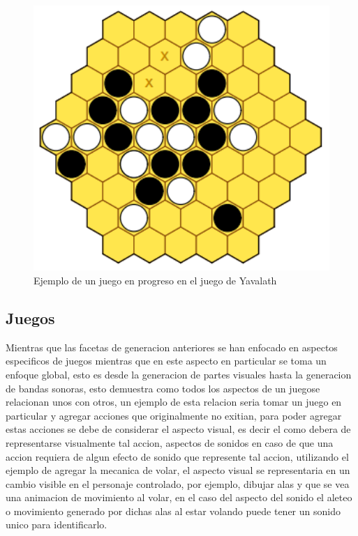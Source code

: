 \begin{figure}
    \centering
    \includegraphics[width=1.0\textwidth]{img/Yavalath.png}
    \caption{Ejemplo de un juego en progreso en el juego de Yavalath}
    \label{figure:Yavalath}
\end{figure}

\subsection{Juegos}
\label{subsection:games}

Mientras que las facetas de generacion anteriores se han enfocado en aspectos
especificos de juegos mientras que en este aspecto en particular se toma un
enfoque global, esto es desde la generacion de partes visuales hasta la 
generacion de bandas sonoras, esto demuestra como todos los aspectos de un
juegose relacionan unos con otros, un ejemplo de esta relacion seria tomar un
juego en particular y agregar acciones que originalmente no exitian, para poder
agregar estas acciones se debe de considerar el aspecto visual, es decir el como
debera de representarse visualmente tal accion, aspectos de sonidos en caso de
que una accion requiera de algun efecto de sonido que represente tal accion,
utilizando el ejemplo de agregar la mecanica de volar, el aspecto visual se
representaria en un cambio visible en el personaje controlado, por ejemplo,
dibujar alas y que se vea una animacion de movimiento al volar, en el caso del
aspecto del sonido el aleteo o movimiento generado por dichas alas al estar
volando puede tener un sonido unico para identificarlo.

